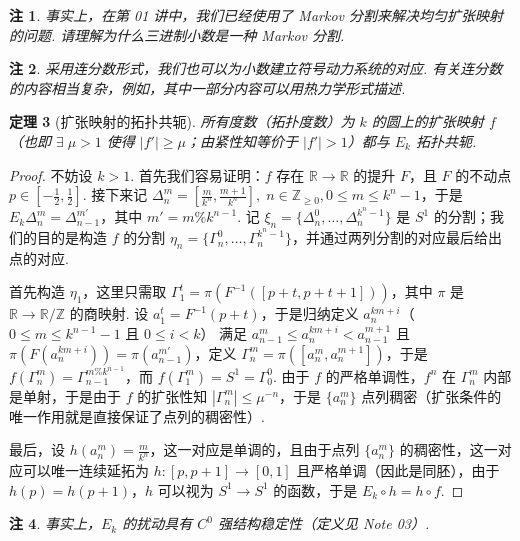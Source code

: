 \documentclass[11pt, a4paper, oneside]{ctexart}
\newtheorem{theorem}{定理}[section]
\newtheorem{remark}[theorem]{注}
\newcommand{\R}{\mathbb{R}}
\newcommand{\Z}{\mathbb{Z}}
\newcommand{\abs}[1]{\left|{#1}\right|}
\begin{document}
    \begin{remark}
        事实上，在第 01 讲中，我们已经使用了 Markov 分割来解决均匀扩张映射的问题. 请理解为什么三进制小数是一种 Markov 分割.
    \end{remark}

    \begin{remark}
        采用连分数形式，我们也可以为小数建立符号动力系统的对应. 有关连分数的内容相当复杂，例如，其中一部分内容可以用热力学形式描述.
    \end{remark}

    \begin{theorem}[扩张映射的拓扑共轭]
        所有度数（拓扑度数）为 $k$ 的圆上的扩张映射 $f$（也即 $\exists\; \mu>1$ 使得 $\abs{f'}\geq\mu$；由紧性知等价于 $\abs{f'}>1$）都与 $E_k$ 拓扑共轭.
    \end{theorem}
    \begin{proof}
        不妨设 $k>1$. 首先我们容易证明：$f$ 存在 $\R\to \R$ 的提升 $F$，且 $F$ 的不动点 $p\in [-\frac{1}{2},\frac{1}{2}]$. 接下来记 $\Delta_n^m=[\frac{m}{k^n},\frac{m+1}{k^n}],\; n\in\Z_{\geq 0},0\leq m\leq k^n-1$，于是 $E_k\Delta_n^m=\Delta_{n-1}^{m'}$，其中 $m'=m\% k^{n-1}$. 记 $\xi_n=\{\Delta_n^0,\ldots,\Delta_n^{k^n-1}\}$ 是 $S^1$ 的分割；我们的目的是构造 $f$ 的分割 $\eta_n=\{\Gamma_n^0,\ldots,\Gamma_n^{k^n-1}\}$，并通过两列分割的对应最后给出点的对应.

        首先构造 $\eta_1$，这里只需取 $\Gamma_1^{t}=\pi(F^{-1}([p+t,p+t+1]))$，其中 $\pi$ 是 $\R\to \R/\Z$ 的商映射. 设 $a_1^t=F^{-1}(p+t)$，于是归纳定义 $a_n^{km+i}$（$0\leq m\leq k^{n-1}-1$ 且 $0\leq i<k$） 满足 $a_{n-1}^m\leq a_n^{km+i}<a_{n-1}^{m+1}$ 且 $\pi(F(a_n^{km+i}))=\pi(a_{n-1}^{m'})$，定义 $\Gamma_n^m=\pi([a_n^m,a_n^{m+1}])$，于是 $f(\Gamma_n^m)=\Gamma_{n-1}^{m\% k^{n-1}}$，而 $f(\Gamma_1^m)=S^1=\Gamma_0^0$. 由于 $f$ 的严格单调性，$f^n$ 在 $\Gamma_n^m$ 内部是单射，于是由于 $f$ 的扩张性知 $\abs{\Gamma_n^m}\leq \mu^{-n}$，于是 $\{a_n^m\}$ 点列稠密（扩张条件的唯一作用就是直接保证了点列的稠密性）.

        最后，设 $h(a_n^m)=\frac{m}{k^n}$，这一对应是单调的，且由于点列 $\{a_n^m\}$ 的稠密性，这一对应可以唯一连续延拓为 $h:[p,p+1]\to [0,1]$ 且严格单调（因此是同胚），由于 $h(p)=h(p+1)$，$h$ 可以视为 $S^1\to S^1$ 的函数，于是 $E_k\circ h=h\circ f$.
    \end{proof}
    \begin{remark}
        事实上，$E_k$ 的扰动具有 $C^0$ 强结构稳定性（定义见 Note 03）.
    \end{remark}
\end{document}
